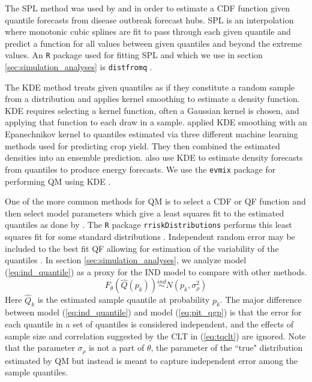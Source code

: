 \documentclass[preprint,12pt,authoryear]{elsarticle}
\begin{document}
The SPL method was used by \cite{gerding2023evaluating} and \cite{shandross2024hubensembles} in order to estimate a CDF function given quantile forecasts from disease outbreak forecast hubs. SPL is an interpolation where monotonic cubic splines are fit to pass through each given quantile and predict a function for all values between given quantiles and beyond the extreme values. An \texttt{R} package used for fitting SPL and which we use in section \ref{sec:simulation_analyses} is \texttt{distfromq} \cite[]{ray2024quantmatch}.

The KDE method treats given quantiles as if they constitute a random sample from a distribution and applies kernel smoothing to estimate a density function. KDE requires selecting a kernel function, often a Gaussian kernel is chosen, and applying that function to each draw in a sample. \cite{gyamerah2020probabilistic} applied KDE smoothing with an Epanechnikov kernel to quantiles estimated via three different machine learning methods used for predicting crop yield. They then combined the estimated densities into an ensemble prediction. \cite{he2016short} also use KDE to estimate density forecasts from quantiles to produce energy forecasts. We use the \texttt{evmix} package for performing QM using KDE \cite[]{yang2018kde}.

One of the more common methods for QM is to select a CDF or QF function and then select model parameters which give a least squares fit to the estimated quantiles as done by \cite{li2019combining}. 
The \texttt{R} package \texttt{rriskDistributions} performs this least squares fit for some standard distributions \cite[]{belgorodski2017quantilemse}. Independent random error may be included to the best fit QF allowing for estimation of the variability of the quantiles \cite[]{nirwan2020bayesian}. In section \ref{sec:simulation_analyses}, we analyze model (\ref{eq:ind_quantile}) as a proxy for the IND model to compare with other methods. 
\begin{equation}
    \label{eq:ind_quantile}
    F_{\theta}(\hat{Q}(p_k)) \overset{ind}{\sim} N(p_k, \sigma_{\rho}^2)
\end{equation}
Here $\hat{Q}_k$ is the estimated sample quantile at probability $p_k$. The major difference between model (\ref{eq:ind_quantile}) and model (\ref{eq:pit_qgp}) is that the error for each quantile in a set of quantiles is considered independent, and the effects of sample size and correlation suggested by the CLT in (\ref{eq:tqclt}) are ignored. Note that the parameter $\sigma_{\rho}$ is not a part of $\theta$, the parameter of the ``true" distribution estimated by QM but instead is meant to capture independent error among the sample quantiles.
\end{document}

